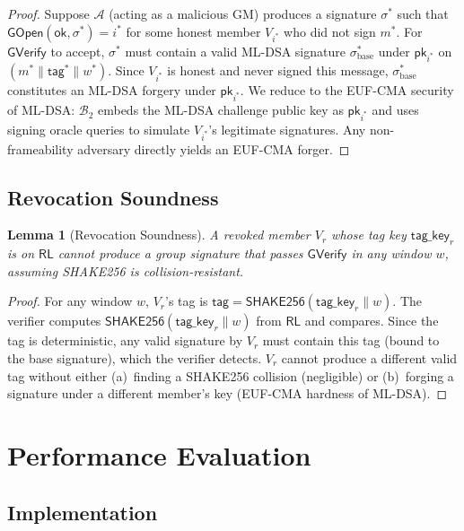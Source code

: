\documentclass[conference,10pt]{IEEEtran}
\newcommand{\shake}{\textsf{SHAKE256}}
\newcommand{\advA}{\mathcal{A}}
\newcommand{\advB}{\mathcal{B}}
\newtheorem{lemma}[theorem]{Lemma}
\begin{document}
\begin{proof}
Suppose $\advA$ (acting as a malicious GM) produces a signature $\sigma^*$ such that $\mathsf{GOpen}(\mathsf{ok}, \sigma^*) = i^*$ for some honest member $V_{i^*}$ who did not sign $m^*$. For $\mathsf{GVerify}$ to accept, $\sigma^*$ must contain a valid ML-DSA signature $\sigma_{\mathrm{base}}^*$ under $\mathsf{pk}_{i^*}$ on $(m^* \| \mathsf{tag}^* \| w^*)$. Since $V_{i^*}$ is honest and never signed this message, $\sigma_{\mathrm{base}}^*$ constitutes an ML-DSA forgery under $\mathsf{pk}_{i^*}$. We reduce to the EUF-CMA security of ML-DSA: $\advB_2$ embeds the ML-DSA challenge public key as $\mathsf{pk}_{i^*}$ and uses signing oracle queries to simulate $V_{i^*}$'s legitimate signatures. Any non-frameability adversary directly yields an EUF-CMA forger.
\end{proof}

\subsection{Revocation Soundness}

\begin{lemma}[Revocation Soundness]
A revoked member $V_r$ whose tag key $\mathsf{tag\_key}_r$ is on $\mathsf{RL}$ cannot produce a group signature that passes $\mathsf{GVerify}$ in any window $w$, assuming \shake{} is collision-resistant.
\end{lemma}

\begin{proof}
For any window $w$, $V_r$'s tag is $\mathsf{tag} = \shake(\mathsf{tag\_key}_r \| w)$. The verifier computes $\shake(\mathsf{tag\_key}_r \| w)$ from $\mathsf{RL}$ and compares. Since the tag is deterministic, any valid signature by $V_r$ must contain this tag (bound to the base signature), which the verifier detects. $V_r$ cannot produce a different valid tag without either (a)~finding a \shake{} collision (negligible) or (b)~forging a signature under a different member's key (EUF-CMA hardness of ML-DSA).
\end{proof}

\section{Performance Evaluation}
\label{sec:evaluation}

\subsection{Implementation}
\end{document}
